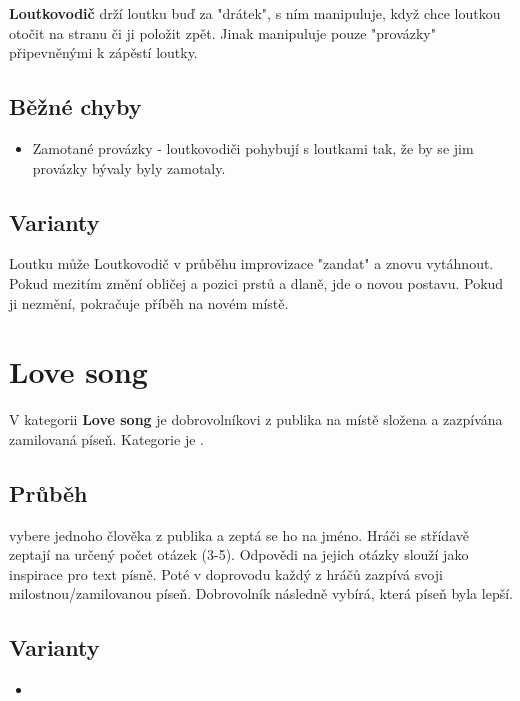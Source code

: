 \textbf{Loutkovodič}{} drží loutku buď  za "drátek", s ním manipuluje, když chce loutkou otočit na stranu či ji položit zpět. 
Jinak manipuluje pouze "provázky"{} připevněnými k zápěstí loutky.   
  
\subsection{ Běžné chyby } \begin{itemize}
\item  Zamotané provázky - loutkovodiči pohybují s loutkami tak, že by se jim provázky bývaly byly zamotaly.
\end{itemize}
 
 
\subsection{Varianty} Loutku může Loutkovodič v průběhu improvizace "zandat"{} a znovu vytáhnout. Pokud mezitím změní obličej a pozici prstů a dlaně, jde o novou postavu. Pokud ji nezmění, pokračuje příběh na novém místě.  
 
 
 
\needspace{5cm} \section{Love song} \label{love song}  
 
 
V kategorii \textbf{Love song}{} je dobrovolníkovi z publika na místě složena a zazpívána zamilovaná píseň. Kategorie je . 
 
 
\subsection{Průběh}  vybere jednoho člověka z publika a zeptá se ho na jméno. Hráči se střídavě zeptají na určený počet otázek (3-5). Odpovědi na jejich otázky slouží jako inspirace pro text písně. Poté v doprovodu  každý z hráčů zazpívá svoji milostnou/zamilovanou píseň. Dobrovolník následně vybírá, která píseň byla lepší. 
 
\subsection{ Varianty } \begin{itemize}
\item {}
\end{itemize}
 
